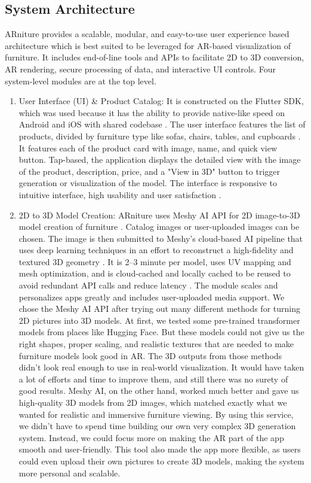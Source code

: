 \documentclass[12pt, a4paper]{article}
\begin{document}
\subsection{System Architecture}
ARniture provides a scalable, modular, and easy-to-use user experience based architecture which is best suited to be leveraged for AR-based visualization of furniture. It includes end-of-line tools and APIs to facilitate 2D to 3D conversion, AR rendering, secure processing of data, and interactive UI controls. Four system-level modules are at the top level.
\begin{enumerate}
    \item User Interface (UI) \& Product Catalog: It is constructed on the Flutter SDK, which was used because it has the ability to provide native-like speed on Android and iOS with shared codebase \cite{ref3,ref9}. The user interface features the list of products, divided by furniture type like sofas, chairs, tables, and cupboards \cite{ref6}. It features each of the product card with image, name, and quick view button. Tap-based, the application displays the detailed view with the image of the product, description, price, and a "View in 3D" button to trigger generation or visualization of the model. The interface is responsive to intuitive interface, high usability and user satisfaction \cite{ref8}.
    \item 2D to 3D Model Creation: ARniture uses Meshy AI API for 2D image-to-3D model creation of furniture \cite{ref5}. Catalog images or user-uploaded images can be chosen. The image is then submitted to Meshy's cloud-based AI pipeline that uses deep learning techniques in an effort to reconstruct a high-fidelity and textured 3D geometry \cite{ref12}. It is 2--3 minute per model, uses UV mapping and mesh optimization, and is cloud-cached and locally cached to be reused to avoid redundant API calls and reduce latency \cite{ref20}. The module scales and personalizes apps greatly and includes user-uploaded media support. We chose the Meshy AI API after trying out many different methods for turning 2D pictures into 3D models. At first, we tested some pre-trained transformer models from places like Hugging Face. But these models could not give us the right shapes, proper scaling, and realistic textures that are needed to make furniture models look good in AR. The 3D outputs from those methods didn't look real enough to use in real-world visualization. It would have taken a lot of efforts and time to improve them, and still there was no surety of good results. Meshy AI, on the other hand, worked much better and gave us high-quality 3D models from 2D images, which matched exactly what we wanted for realistic and immersive furniture viewing. By using this service, we didn't have to spend time building our own very complex 3D generation system. Instead, we could focus more on making the AR part of the app smooth and user-friendly. This tool also made the app more flexible, as users could even upload their own pictures to create 3D models, making the system more personal and scalable.

\end{enumerate}
\end{document}
